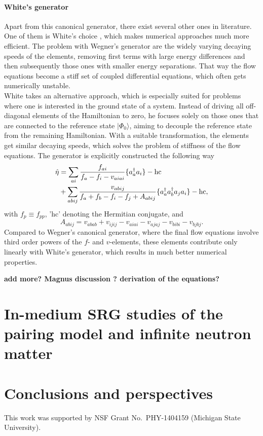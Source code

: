 \paragraph{White's generator}
Apart from this canonical generator, there exist several other ones in
literature. One of them is White's choice
\cite{White:2002fk}, which makes numerical approaches much
more efficient.  The problem with Wegner's generator are the widely
varying decaying speeds of the elements, removing first terms with
large energy differences and then subsequently those ones with smaller
energy separations.  That way the flow equations become a stiff set of
coupled differential equations, which often gets numerically
unstable.\\ White takes an alternative approach, which is especially
suited for problems where one is interested in the ground state of a
system. Instead of driving all off-diagonal elements of the
Hamiltonian to zero, he focuses solely on those ones that are
connected to the reference state $|\Phi_0\rangle$, aiming to decouple
the reference state from the remaining Hamiltonian. With a suitable
transformation, the elements get similar decaying speeds, which solves
the problem of stiffness of the flow equations.  The generator is
explicitly constructed the following way \cite{White:2002fk}
\begin{align}
\hat{\eta} &= \sum_{ai} \frac{f_{ai}}{f_a-f_i-v_{aiai}}\lbrace a_a^{\dagger}a_i\rbrace -\text{hc} \notag \\ & + \sum_{abij}
\frac{v_{abij}}{f_a+f_b-f_i-f_j+A_{abij}}\lbrace a_a^{\dagger}a_b^{\dagger}a_j
a_i\rbrace - \text{hc},
\label{eq:WhiteFull}
\end{align}
with $f_p \equiv f_{pp}$, 'hc' denoting the Hermitian conjugate, and
\[
A_{abij} = v_{abab} + v_{ijij} - v_{aiai} - v_{ajaj} - v_{bibi} -
v_{bjbj}.
\label{eq:White7}
\]
Compared to Wegner's canonical generator, where the final flow
equations involve third order powers of the $f$- and $v$-elements,
these elements contribute only linearly with White's generator, which
results in much better numerical properties.


{\bf add more? Magnus discussion ? derivation of the equations?}




\section{In-medium SRG studies of the pairing model and infinite neutron matter}

\section{Conclusions and perspectives}


\begin{acknowledgement}
This work was supported by NSF Grant No.~PHY-1404159 (Michigan State University).
\end{acknowledgement}



% 
    
